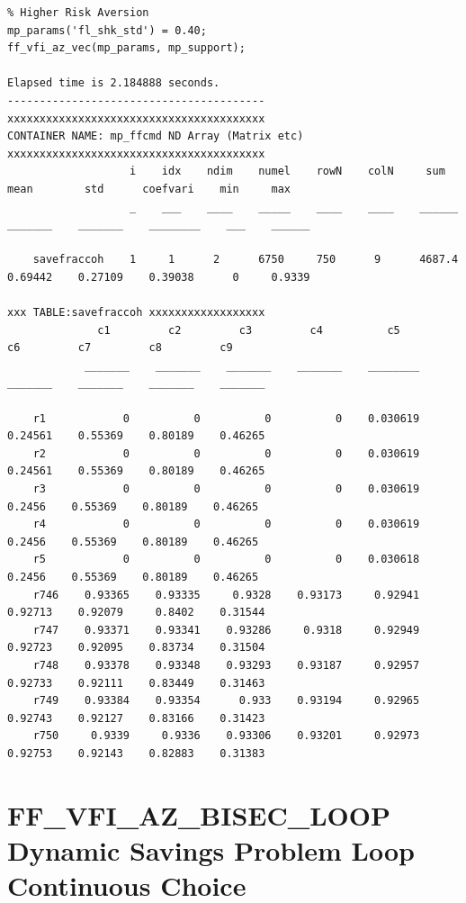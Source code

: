 \documentclass[
]{book}
\begin{document}
\begin{verbatim}
% Higher Risk Aversion
mp_params('fl_shk_std') = 0.40;
ff_vfi_az_vec(mp_params, mp_support);

Elapsed time is 2.184888 seconds.
----------------------------------------
xxxxxxxxxxxxxxxxxxxxxxxxxxxxxxxxxxxxxxxx
CONTAINER NAME: mp_ffcmd ND Array (Matrix etc)
xxxxxxxxxxxxxxxxxxxxxxxxxxxxxxxxxxxxxxxx
                   i    idx    ndim    numel    rowN    colN     sum       mean        std      coefvari    min     max  
                   _    ___    ____    _____    ____    ____    ______    _______    _______    ________    ___    ______

    savefraccoh    1     1      2      6750     750      9      4687.4    0.69442    0.27109    0.39038      0     0.9339

xxx TABLE:savefraccoh xxxxxxxxxxxxxxxxxx
              c1         c2         c3         c4          c5         c6         c7         c8         c9   
            _______    _______    _______    _______    ________    _______    _______    _______    _______

    r1            0          0          0          0    0.030619    0.24561    0.55369    0.80189    0.46265
    r2            0          0          0          0    0.030619    0.24561    0.55369    0.80189    0.46265
    r3            0          0          0          0    0.030619     0.2456    0.55369    0.80189    0.46265
    r4            0          0          0          0    0.030619     0.2456    0.55369    0.80189    0.46265
    r5            0          0          0          0    0.030618     0.2456    0.55369    0.80189    0.46265
    r746    0.93365    0.93335     0.9328    0.93173     0.92941    0.92713    0.92079     0.8402    0.31544
    r747    0.93371    0.93341    0.93286     0.9318     0.92949    0.92723    0.92095    0.83734    0.31504
    r748    0.93378    0.93348    0.93293    0.93187     0.92957    0.92733    0.92111    0.83449    0.31463
    r749    0.93384    0.93354      0.933    0.93194     0.92965    0.92743    0.92127    0.83166    0.31423
    r750     0.9339     0.9336    0.93306    0.93201     0.92973    0.92753    0.92143    0.82883    0.31383
\end{verbatim}

\hypertarget{ff_vfi_az_bisec_loop-dynamic-savings-problem-loop-continuous-choice}{%
\section{FF\_VFI\_AZ\_BISEC\_LOOP Dynamic Savings Problem Loop Continuous Choice}\label{ff_vfi_az_bisec_loop-dynamic-savings-problem-loop-continuous-choice}}
\end{document}
